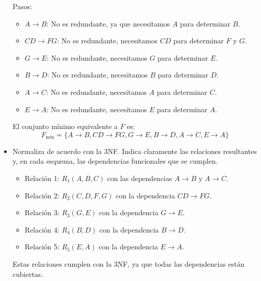 \begin{itemize}
	Pasos:
	\begin{itemize}
		\item \( A \rightarrow B \): No es redundante, ya que necesitamos \( A \) para determinar \( B \).
		\item \( CD \rightarrow FG \): No es redundante, necesitamos \( CD \) para determinar \( F \) y \( G \).
		\item \( G \rightarrow E \): No es redundante, necesitamos \( G \) para determinar \( E \).
		\item \( B \rightarrow D \): No es redundante, necesitamos \( B \) para determinar \( D \).
		\item \( A \rightarrow C \): No es redundante, necesitamos \( A \) para determinar \( C \).
		\item \( E \rightarrow A \): No es redundante, necesitamos \( E \) para determinar \( A \).
	\end{itemize}
	El conjunto mínimo equivalente a \( F \) es:
	\[
	F_{\text{mín}} = \{ A \rightarrow B, CD \rightarrow FG, G \rightarrow E, B \rightarrow D, A \rightarrow C, E \rightarrow A \}
	\]
	\vspace*{.3cm}
	
	\item Normaliza de acuerdo con la 3NF. Indica claramente las relaciones resultantes y, en cada esquema, las dependencias funcionales que se cumplen.
	\begin{itemize}
		\item Relación 1: \( R_1(A, B, C) \) con las dependencias \( A \rightarrow B \) y \( A \rightarrow C \).
		\item Relación 2: \( R_2(C, D, F, G) \) con la dependencia \( CD \rightarrow FG \).
		\item Relación 3: \( R_3(G, E) \) con la dependencia \( G \rightarrow E \).
		\item Relación 4: \( R_4(B, D) \) con la dependencia \( B \rightarrow D \).
		\item Relación 5: \( R_5(E, A) \) con la dependencia \( E \rightarrow A \).
	\end{itemize}
	Estas relaciones cumplen con la 3NF, ya que todas las dependencias están cubiertas.
\end{itemize}